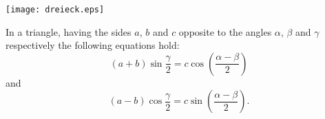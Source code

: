 \documentclass[12pt]{article}
\begin{document}
\begin{center}
\texttt{[image: dreieck.eps]}\\[10pt]
\end{center}
In a triangle, having the sides $a$, $b$ and $c$ opposite to the angles $\alpha$, $\beta$ and $\gamma$ respectively the following equations hold:
$$(a+b)\sin \frac{\gamma}{2}=c\cos\left(\frac{\alpha -\beta}{2}\right)$$
and
$$(a-b)\cos\frac{\gamma}{2}=c\sin\left(\frac{\alpha -\beta}{2}\right).$$
\end{document}
